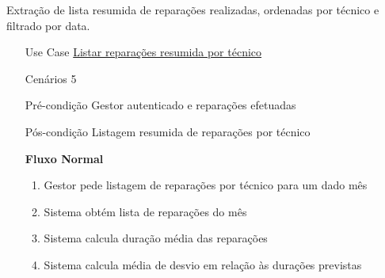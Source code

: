 \documentclass[../relatorio.tex]{subfiles}
\begin{document}
Extração de lista resumida de reparações realizadas, ordenadas por técnico e filtrado por data.
\begin{itemize}
    \item[Use Case] {\underline{Listar reparações resumida por técnico}}
    \item[Cenários] {5}
    \item[Pré-condição] {Gestor autenticado e reparações efetuadas}
    \item[Pós-condição] {Listagem resumida de reparações por técnico}
          \begin{flushleft}
              \textbf{Fluxo Normal}
          \end{flushleft}
          \begin{enumerate} 
              \item Gestor pede listagem de reparações por técnico para um dado mês %
              \item Sistema obtém lista de reparações do mês %
              \item Sistema calcula duração média das reparações %
              \item Sistema calcula média de desvio em relação às durações previstas %
          \end{enumerate}
\end{itemize}
\end{document}
